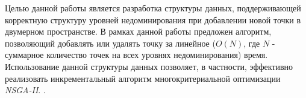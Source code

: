 Целью данной работы является разработка структуры данных, поддерживающей корректную 
структуру уровней недоминирования при добавлении новой точки в двумерном пространстве.
В рамках данной работы предложен алгоритм, позволяющий добавлять или удалять точку за 
линейное ($O(N)$, где $N$ - суммарное количество точек на всех уровнях недоминирования)
время. Использование данной структуры данных позволяет, в частности, эффективно реализовать 
инкрементальный алгоритм многокритериальной оптимизации \textit{NSGA-II}. 
\cite{max_me_ss_nsga2}.
